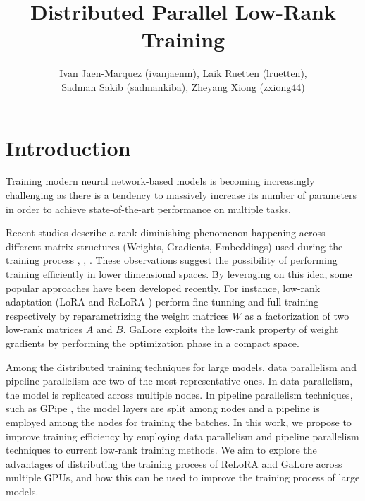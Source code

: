 \documentclass[pdftex,twocolumn,10pt,letterpaper]{article}
\begin{document}
\title{Distributed Parallel Low-Rank Training}
\author{Ivan Jaen-Marquez (ivanjaenm), Laik Ruetten (lruetten), \\ Sadman Sakib (sadmankiba), Zheyang Xiong (zxiong44)}

\date{}


\maketitle

\section{Introduction}

Training modern neural network-based models is becoming increasingly challenging as there is a tendency to massively increase its number of parameters in order to achieve state-of-the-art performance on multiple tasks.

Recent studies describe a rank diminishing phenomenon happening across different matrix structures (Weights, Gradients, Embeddings) used during the training process \cite{huh2023simplicitybias}, \cite{9782552}, \cite{le2022training}. These observations suggest the possibility of performing training efficiently in lower dimensional spaces. By leveraging on this idea, some popular approaches have been developed recently. For instance, low-rank adaptation (LoRA  \cite{Hu2021LoRA} and ReLoRA \cite{lialin2023relora}) perform fine-tunning and full training respectively by reparametrizing the weight matrices $W$ as a factorization of two low-rank matrices $A$ and $B$. GaLore \cite{zhao2024galore} exploits the low-rank property of weight gradients by performing the optimization phase in a compact space.

Among the distributed training techniques for large models, data parallelism and pipeline parallelism are two of the most representative ones. In data parallelism, the model is replicated across multiple nodes. In pipeline parallelism techniques, such as GPipe \cite{gpipe}, the model layers are split among nodes and a pipeline is employed among the nodes for training the batches. In this work, we propose to improve training efficiency by employing data parallelism and pipeline parallelism techniques to current low-rank training methods. We aim to explore the advantages of distributing the training process of ReLoRA and GaLore across multiple GPUs, and how this can be used to improve the training process of large models.
\end{document}
